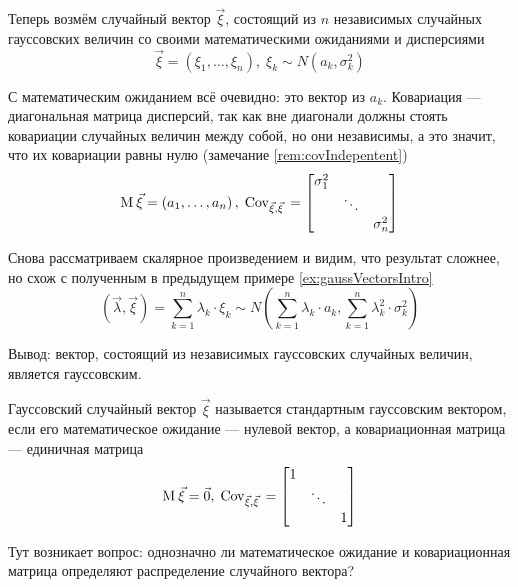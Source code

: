\begin{example}
    Теперь возмём случайный вектор $\vec{\xi}$, состоящий из $n$ независимых
    случайных гауссовских величин со своими математическими ожиданиями
    и дисперсиями
    $$\vec{\xi} = \left( \xi_1, \dots, \xi_n \right),\;
        \xi_k \sim N\left( a_k, \sigma_k^2 \right)$$

    С математическим ожиданием всё очевидно: это вектор
    из $a_k$. Ковариация --- диагональная матрица дисперсий, так как вне
    диагонали должны стоять ковариации случайных величин между собой,
    но они независимы, а это значит, что их ковариации равны нулю
    (замечание \ref{rem:covIndepentent})
    $$\operatorname{M}_{} \vec{\xi} = \left( a_1, \dots, a_n \right),\;
        \operatorname{Cov}_{\vec{\xi}, \vec{\xi}}\, =
        \begin{bmatrix}
            \sigma_1^2 & & \\
            & \ddots & \\
            & & \sigma_n^2
        \end{bmatrix}$$

    Снова рассматриваем скалярное произведением и видим, что результат сложнее,
    но схож с полученным в предыдущем примере \ref{ex:gaussVectorsIntro}
    $$\left( \vec{\lambda}, \vec{\xi} \right)
        = \sum_{k=1}^{n} \lambda_k \cdot \xi_k \sim
        N\left( \sum_{k=1}^{n} \lambda_k \cdot a_k,
        \sum_{k=1}^{n} \lambda_k^2 \cdot \sigma_k^2 \right)$$

    Вывод: вектор, состоящий из независимых гауссовских случайных величин,
    является гауссовским.
\end{example}

\begin{definition}
    Гауссовский случайный вектор $\vec{\xi}$ называется стандартным гауссовским
    вектором, если его математическое ожидание --- нулевой вектор,
    а ковариационная матрица --- единичная матрица
    $$\operatorname{M}_{} \vec{\xi} = \vec{0},\;
        \operatorname{Cov}_{\vec{\xi}, \vec{\xi}}\, =
        \begin{bmatrix}
            1 & & \\
            & \ddots & \\
            & & 1
        \end{bmatrix}$$
\end{definition}

Тут возникает вопрос: однозначно ли математическое ожидание
и ковариационная матрица определяют распределение случайного вектора?

